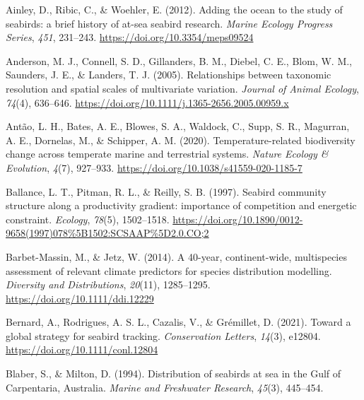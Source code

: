 \documentclass{article}
\newlength{\cslhangindent}
\newlength{\cslentryspacingunit} %
\newenvironment{CSLReferences}[2] %
 {%
  \setlength{\parindent}{0pt}
  \ifodd #1
  \let\oldpar\par
  \def\par{\hangindent=\cslhangindent\oldpar}
  \fi
  \setlength{\parskip}{#2\cslentryspacingunit}
 }%
 {}
\begin{document}
\hypertarget{refs}{}
\begin{CSLReferences}{1}{0}
\leavevmode{}%
Ainley, D., Ribic, C., \& Woehler, E. (2012). Adding the ocean to the
study of seabirds: a brief history of at-sea seabird research.
\emph{Marine Ecology Progress Series}, \emph{451}, 231--243.
\url{https://doi.org/10.3354/meps09524}

\leavevmode{}%
Anderson, M. J., Connell, S. D., Gillanders, B. M., Diebel, C. E., Blom,
W. M., Saunders, J. E., \& Landers, T. J. (2005). Relationships between
taxonomic resolution and spatial scales of multivariate variation.
\emph{Journal of Animal Ecology}, \emph{74}(4), 636--646.
\url{https://doi.org/10.1111/j.1365-2656.2005.00959.x}

\leavevmode{}%
Antão, L. H., Bates, A. E., Blowes, S. A., Waldock, C., Supp, S. R.,
Magurran, A. E., Dornelas, M., \& Schipper, A. M. (2020).
Temperature-related biodiversity change across temperate marine and
terrestrial systems. \emph{Nature Ecology \& Evolution}, \emph{4}(7),
927--933. \url{https://doi.org/10.1038/s41559-020-1185-7}

\leavevmode{}%
Ballance, L. T., Pitman, R. L., \& Reilly, S. B. (1997). Seabird
community structure along a productivity gradient: importance of
competition and energetic constraint. \emph{Ecology}, \emph{78}(5),
1502--1518.
\url{https://doi.org/10.1890/0012-9658(1997)078\%5B1502:SCSAAP\%5D2.0.CO;2}

\leavevmode{}%
Barbet-Massin, M., \& Jetz, W. (2014). A 40-year, continent-wide,
multispecies assessment of relevant climate predictors for species
distribution modelling. \emph{Diversity and Distributions},
\emph{20}(11), 1285--1295. \url{https://doi.org/10.1111/ddi.12229}

\leavevmode{}%
Bernard, A., Rodrigues, A. S. L., Cazalis, V., \& Grémillet, D. (2021).
Toward a global strategy for seabird tracking. \emph{Conservation
Letters}, \emph{14}(3), e12804. \url{https://doi.org/10.1111/conl.12804}

\leavevmode{}%
Blaber, S., \& Milton, D. (1994). Distribution of seabirds at sea in the
{G}ulf of {C}arpentaria, {A}ustralia. \emph{Marine and Freshwater
Research}, \emph{45}(3), 445--454.


\end{CSLReferences}
\end{document}
